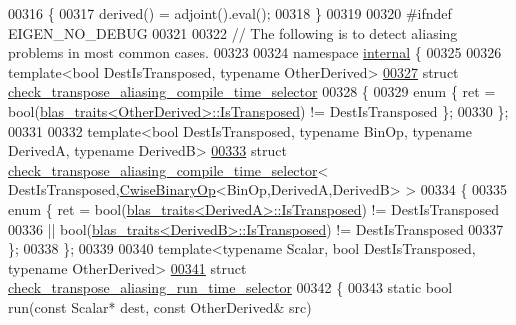 \begin{DoxyCode}
00316 \{
00317   derived() = adjoint().eval();
00318 \}
00319 
00320 \textcolor{preprocessor}{#ifndef EIGEN\_NO\_DEBUG}
00321 
00322 \textcolor{comment}{// The following is to detect aliasing problems in most common cases.}
00323 
00324 \textcolor{keyword}{namespace }\hyperlink{namespaceinternal}{internal} \{
00325 
00326 \textcolor{keyword}{template}<\textcolor{keywordtype}{bool} DestIsTransposed, \textcolor{keyword}{typename} OtherDerived>
\hyperlink{struct_eigen_1_1internal_1_1check__transpose__aliasing__compile__time__selector}{00327} \textcolor{keyword}{struct }\hyperlink{struct_eigen_1_1internal_1_1check__transpose__aliasing__compile__time__selector}{check\_transpose\_aliasing\_compile\_time\_selector}
00328 \{
00329   \textcolor{keyword}{enum} \{ ret = bool(\hyperlink{struct_eigen_1_1internal_1_1blas__traits}{blas\_traits<OtherDerived>::IsTransposed}) != 
      DestIsTransposed \};
00330 \};
00331 
00332 \textcolor{keyword}{template}<\textcolor{keywordtype}{bool} DestIsTransposed, \textcolor{keyword}{typename} BinOp, \textcolor{keyword}{typename} DerivedA, \textcolor{keyword}{typename} DerivedB>
\hyperlink{struct_eigen_1_1internal_1_1check__transpose__aliasing__compile__time__selector_3_01_dest_is_tra9f4c4ffc0d2b0b4cca6adac98dc1ed17}{00333} \textcolor{keyword}{struct }\hyperlink{struct_eigen_1_1internal_1_1check__transpose__aliasing__compile__time__selector}{check\_transpose\_aliasing\_compile\_time\_selector}<
      DestIsTransposed,\hyperlink{group___core___module_class_eigen_1_1_cwise_binary_op}{CwiseBinaryOp}<BinOp,DerivedA,DerivedB> >
00334 \{
00335   \textcolor{keyword}{enum} \{ ret =    bool(\hyperlink{struct_eigen_1_1internal_1_1blas__traits}{blas\_traits<DerivedA>::IsTransposed}) != 
      DestIsTransposed
00336                || bool(\hyperlink{struct_eigen_1_1internal_1_1blas__traits}{blas\_traits<DerivedB>::IsTransposed}) != 
      DestIsTransposed
00337   \};
00338 \};
00339 
00340 \textcolor{keyword}{template}<\textcolor{keyword}{typename} Scalar, \textcolor{keywordtype}{bool} DestIsTransposed, \textcolor{keyword}{typename} OtherDerived>
\hyperlink{struct_eigen_1_1internal_1_1check__transpose__aliasing__run__time__selector}{00341} \textcolor{keyword}{struct }\hyperlink{struct_eigen_1_1internal_1_1check__transpose__aliasing__run__time__selector}{check\_transpose\_aliasing\_run\_time\_selector}
00342 \{
00343   \textcolor{keyword}{static} \textcolor{keywordtype}{bool} run(\textcolor{keyword}{const} Scalar* dest, \textcolor{keyword}{const} OtherDerived& src)

\end{DoxyCode}
